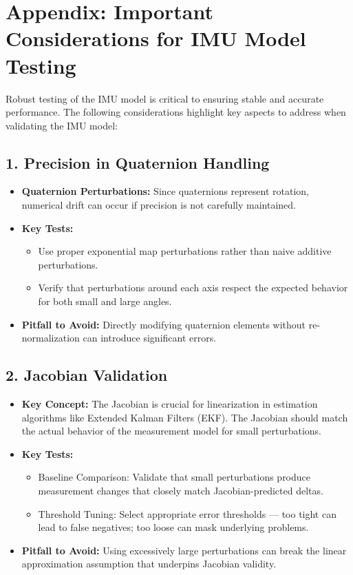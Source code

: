 \documentclass{article}
\begin{document}
\appendix
\section*{Appendix: Important Considerations for IMU Model Testing}

Robust testing of the IMU model is critical to ensuring stable and accurate performance. The following considerations highlight key aspects to address when validating the IMU model:

\subsection*{1. Precision in Quaternion Handling}
\begin{itemize}
	\item \textbf{Quaternion Perturbations:} Since quaternions represent rotation, numerical drift can occur if precision is not carefully maintained.
	\item \textbf{Key Tests:}
	\begin{itemize}
		\item Use proper exponential map perturbations rather than naive additive perturbations.
		\item Verify that perturbations around each axis respect the expected behavior for both small and large angles.
	\end{itemize}
	\item \textbf{Pitfall to Avoid:} Directly modifying quaternion elements without re-normalization can introduce significant errors.
\end{itemize}

\subsection*{2. Jacobian Validation}
\begin{itemize}
	\item \textbf{Key Concept:} The Jacobian is crucial for linearization in estimation algorithms like Extended Kalman Filters (EKF). The Jacobian should match the actual behavior of the measurement model for small perturbations.
	\item \textbf{Key Tests:}
	\begin{itemize}
		\item Baseline Comparison: Validate that small perturbations produce measurement changes that closely match Jacobian-predicted deltas.
		\item Threshold Tuning: Select appropriate error thresholds — too tight can lead to false negatives; too loose can mask underlying problems.
	\end{itemize}
	\item \textbf{Pitfall to Avoid:} Using excessively large perturbations can break the linear approximation assumption that underpins Jacobian validity.
\end{itemize}
\end{document}
